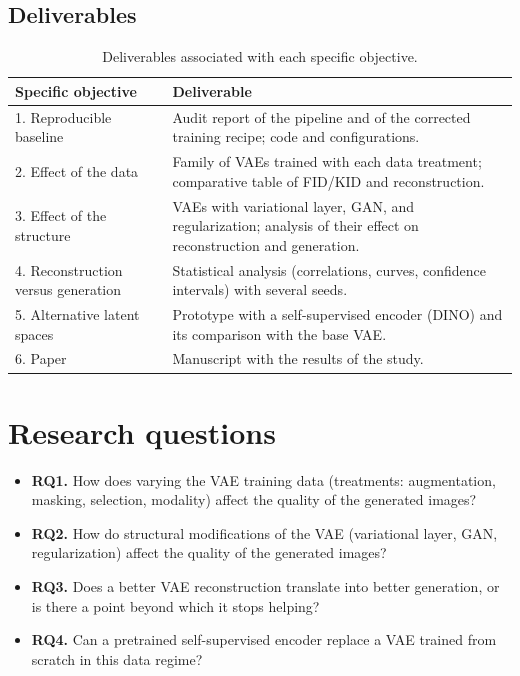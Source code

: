 \subsection{Deliverables}

\begin{table}[h]
\centering
\small
\begin{tabular}{p{}p{}}
\hline
\textbf{Specific objective} & \textbf{Deliverable} \\
\hline
1. Reproducible baseline & Audit report of the pipeline and of the corrected training recipe; code and configurations. \\
2. Effect of the data & Family of VAEs trained with each data treatment; comparative table of FID/KID and reconstruction. \\
3. Effect of the structure & VAEs with variational layer, GAN, and regularization; analysis of their effect on reconstruction and generation. \\
4. Reconstruction versus generation & Statistical analysis (correlations, curves, confidence intervals) with several seeds. \\
5. Alternative latent spaces & Prototype with a self-supervised encoder (DINO) and its comparison with the base VAE. \\
6. Paper & Manuscript with the results of the study. \\
\hline
\end{tabular}
\caption{Deliverables associated with each specific objective.}
\end{table}

\section{Research questions}

\begin{itemize}
  \item \textbf{RQ1.} How does varying the VAE training data (treatments: augmentation, masking, selection, modality) affect the quality of the generated images?
  \item \textbf{RQ2.} How do structural modifications of the VAE (variational layer, GAN, regularization) affect the quality of the generated images?
  \item \textbf{RQ3.} Does a better VAE reconstruction translate into better generation, or is there a point beyond which it stops helping?
  \item \textbf{RQ4.} Can a pretrained self-supervised encoder replace a VAE trained from scratch in this data regime?
\end{itemize}

